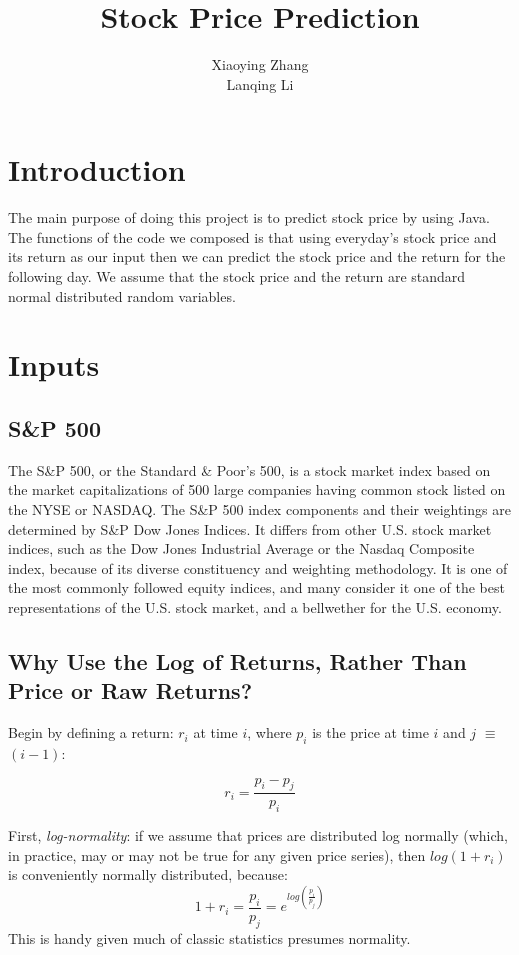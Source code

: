 \documentclass{article}
\title{Stock Price Prediction}
\author{Xiaoying Zhang \\ Lanqing Li}
\begin{document}
\maketitle

\newpage
\tableofcontents

\newpage
\section{Introduction}
The main purpose of doing this project is to predict stock price by using Java. The functions of the code we composed is that using everyday's stock price and its return as our input then we can predict the stock price and the return for the following day. We assume that the stock price and the return are standard normal distributed random variables.

\section{Inputs}
\subsection{S\&P 500}
The S\&P 500, or the Standard \& Poor's 500, is a stock market index based on the market capitalizations of 500 large companies having common stock listed on the NYSE or NASDAQ. The S\&P 500 index components and their weightings are determined by S\&P Dow Jones Indices. It differs from other U.S. stock market indices, such as the Dow Jones Industrial Average or the Nasdaq Composite index, because of its diverse constituency and weighting methodology. It is one of the most commonly followed equity indices, and many consider it one of the best representations of the U.S. stock market, and a bellwether for the U.S. economy.

\subsection{Why Use the Log of Returns, Rather Than Price or Raw Returns?}
Begin by defining a return: $r_i$ at time $i$, where $p_i$ is the price at time $i$ and $j$ $\equiv$ $(i - 1)$:

\[r_i = \frac{p_i - p_j}{p_i}\]

First, {\em log-normality}: if we assume that prices are distributed log normally (which, in practice, may or may not be true for any given price series), then $log(1 + r_i)$ is conveniently normally distributed, because:
\[1 + r_i = \frac{p_i}{p_j} = e^{log(\frac{p_i}{p_j})}\]
This is handy given much of classic statistics presumes normality.
\end{document}
